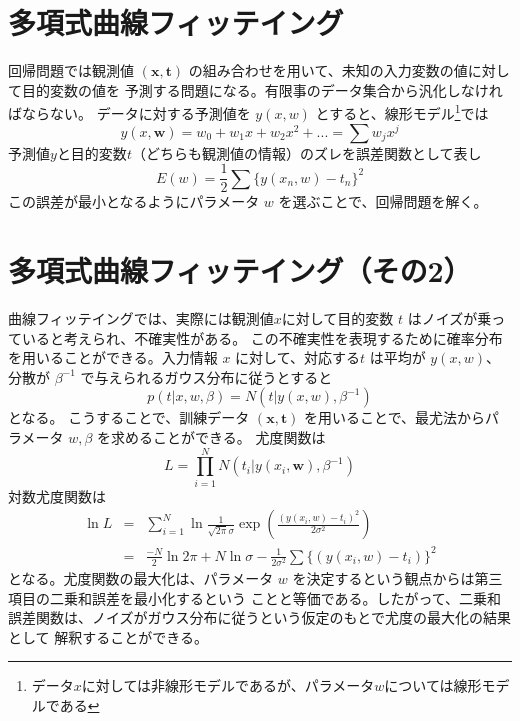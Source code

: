 \documentclass[10pt, a4paper]{ltjsarticle}
\begin{document}
\section{多項式曲線フィッテイング}

回帰問題では観測値 $(\bm{x}, \bm{t})$ の組み合わせを用いて、未知の入力変数の値に対して目的変数の値を
予測する問題になる。有限事のデータ集合から汎化しなければならない。
データに対する予測値を $y(x,w)$ とすると、線形モデル\footnote{データ$x$に対しては非線形モデルであるが、パラメータ$w$については線形モデルである}では
\begin{equation}
  y(x, \bm{w}) = w_0 + w_1x + w_2x^2 + ... = \sum w_jx^j
\end{equation}
予測値$y$と目的変数$t$（どちらも観測値の情報）のズレを誤差関数として表し
\begin{equation}
  E(w) = \frac{1}{2}\sum \{y(x_n, w) - t_n\} ^2
\end{equation}
この誤差が最小となるようにパラメータ $w$ を選ぶことで、回帰問題を解く。


\section{多項式曲線フィッテイング（その2）}

曲線フィッテイングでは、実際には観測値$x$に対して目的変数 $t$ はノイズが乗っていると考えられ、不確実性がある。
この不確実性を表現するために確率分布を用いることができる。入力情報 $x$ に対して、対応する$t$ は平均が $y(x,w)$、
分散が $\beta^{-1}$ で与えられるガウス分布に従うとすると
\begin{equation}
  p(t|x,w,\beta) = N(t|y(x,w), \beta^{-1})
\end{equation}
となる。
こうすることで、訓練データ $(\bm{x},\bm{t})$ を用いることで、最尤法からパラメータ $w,\beta$ を求めることができる。
尤度関数は
\begin{equation}
  L = \prod_{i=1}^N N(t_i|y(x_i,\bm{w}), \beta^{-1})
\end{equation}
対数尤度関数は
\begin{eqnarray}
  \ln L &=& \sum_{i=1}^N \ln \frac{1}{\sqrt{2\pi}\sigma} \exp \left(\frac{(y(x_i,w)-t_i)^2}{2\sigma^2}\right) \\
  &=& \frac{-N}{2} \ln 2\pi + N \ln \sigma - \frac{1}{2\sigma^2} \sum \{(y(x_i,w)-t_i)\}^2
\end{eqnarray}
となる。尤度関数の最大化は、パラメータ $w$ を決定するという観点からは第三項目の二乗和誤差を最小化するという
ことと等価である。したがって、二乗和誤差関数は、ノイズがガウス分布に従うという仮定のもとで尤度の最大化の結果として
解釈することができる。
\end{document}
